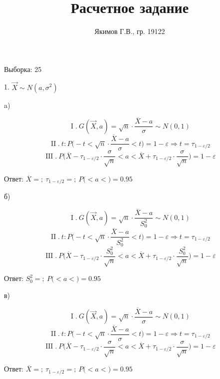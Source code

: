 \documentclass[a4paper,16pt]{article}
\DeclareMathOperator{\I}{I}
\DeclareMathOperator{\II}{II}
\DeclareMathOperator{\III}{III}
\begin{document}
	\pagestyle{fancy}
	\graphicspath{{figures/}}

	\title{Расчетное задание}
	\author{Якимов Г.В., гр. 19122}
	\maketitle

	Выборка: 25


	1. $\overrightarrow{X} \sim N(a, \sigma^2)$

	a)

	\begin{center}
	$$\I. \ G(\overrightarrow{X}, a) = \sqrt{n} \cdot \dfrac{\overline{X} - a}{\sigma} \sim N(0, 1)$$
	$$\II. \ t: P\biggr(-t < \sqrt{n} \cdot \dfrac{\overline{X} - a}{\sigma} < t\biggr) = 1 - \varepsilon \Rightarrow t = \tau_{1-\varepsilon/2}$$
	$$\III. \ P\biggr(\overline{X} -  \tau_{1-\varepsilon/2} \cdot \frac{\sigma}{\sqrt{n}} < a < \overline{X} + \tau_{1-\varepsilon/2} \cdot \frac{\sigma}{\sqrt{n}}\biggr) = 1 - \varepsilon$$
	\end{center}
	Ответ: $\overline{X} = ; \ \tau_{1-\varepsilon/2} = ; \ P\biggr( < a < \biggr) = 0.95$

	б)

	\begin{center}
	$$\I. \ G(\overrightarrow{X}, a) = \sqrt{n} \cdot \dfrac{\overline{X} - a}{S_0^2} \sim N(0, 1)$$
	$$\II. \ t: P\biggr(-t < \sqrt{n} \cdot \dfrac{\overline{X} - a}{S_0^2} < t\biggr) = 1 - \varepsilon \Rightarrow t = \tau_{1-\varepsilon/2}$$
	$$\III. \ P\biggr(\overline{X} -  \tau_{1-\varepsilon/2} \cdot \frac{S_0^2}{\sqrt{n}} < a < \overline{X} + \tau_{1-\varepsilon/2} \cdot \frac{S_0^2}{\sqrt{n}}\biggr) = 1 - \varepsilon$$
	\end{center}
	Ответ: $S_0^2 = ; \ P\biggr( < a < \biggr) = 0.95$

	в)

	\begin{center}
	$$\I. \ G(\overrightarrow{X}, a) = \sqrt{n} \cdot \dfrac{\overline{X} - a}{\sigma} \sim N(0, 1)$$
	$$\II. \ t: P\biggr(-t < \sqrt{n} \cdot \dfrac{\overline{X} - a}{\sigma} < t\biggr) = 1 - \varepsilon \Rightarrow t = \tau_{1-\varepsilon/2}$$
	$$\III. \ P\biggr(\overline{X} -  \tau_{1-\varepsilon/2} \cdot \frac{\sigma}{\sqrt{n}} < a < \overline{X} + \tau_{1-\varepsilon/2} \cdot \frac{\sigma}{\sqrt{n}}\biggr) = 1 - \varepsilon$$
	\end{center}
	Ответ: $\overline{X} = ; \ \tau_{1-\varepsilon/2} = ; \ P\biggr( < a < \biggr) = 0.95$
\end{document}
